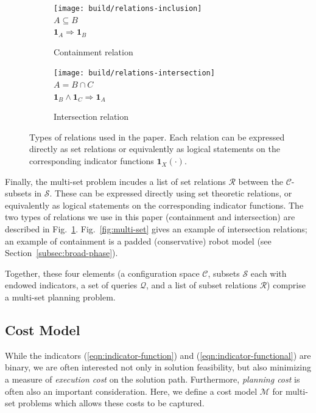 \documentclass{report}
\begin{document}
\begin{figure}
\centering
\begin{subfigure}[t]{0.45\linewidth}
\centering
\texttt{[image: build/relations-inclusion]} \\
$A \subseteq B$ \\
$\mathbf{1}_A \Rightarrow \mathbf{1}_B$
\caption{Containment relation}
\end{subfigure}%
\quad\quad%
\begin{subfigure}[t]{0.45\linewidth}
\centering
\texttt{[image: build/relations-intersection]} \\
$A = B \cap C$ \\
$\mathbf{1}_B \wedge \mathbf{1}_C \Rightarrow \mathbf{1}_A$
\caption{Intersection relation}
\end{subfigure}
\caption{Types of relations used in the paper.
  Each relation can be expressed directly as set relations
  or equivalently as logical statements
  on the corresponding indicator functions
  $\mathbf{1}_X(\cdot)$.}
\label{fig:relations}
\end{figure}

Finally, the multi-set problem incudes a list of set relations
$\mathcal{R}$
between the $\mathcal{C}$-subsets in $\mathcal{S}$.
These can be expressed directly using set theoretic relations,
or equivalently as logical statements
on the corresponding indicator functions.
The two types of relations we use in this paper
(containment and intersection)
are described in Fig.~\ref{fig:relations}.
Fig.~\ref{fig:multi-set} gives an example of intersection relations;
an example of containment is a padded (conservative)
robot model (see Section~\ref{subsec:broad-phase}).

Together, these four elements
(a configuration space $\mathcal{C}$,
subsets $\mathcal{S}$ each with endowed indicators,
a set of queries $\mathcal{Q}$,
and a list of subset relations $\mathcal{R}$)
comprise a multi-set planning problem.

\subsection{Cost Model}
\label{subsec:cost-model}

While the indicators
(\ref{eqn:indicator-function}) and (\ref{eqn:indicator-functional})
are binary,
we are often interested not only in solution feasibility,
but also minimizing a measure of \emph{execution cost}
on the solution path.
Furthermore,
\emph{planning cost} is often also an important consideration.
Here,
we define a cost model $\mathcal{M}$
for multi-set problems
which allows these costs to be captured.
\end{document}
